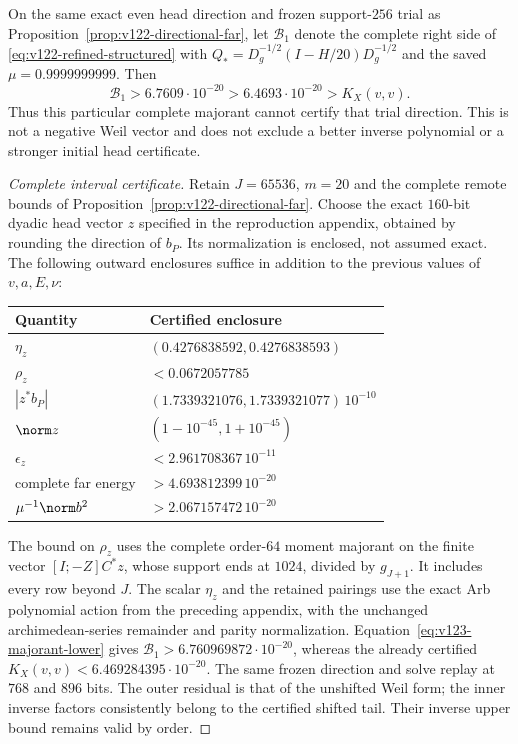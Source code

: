 \begin{proposition}
\label{prop:v123-first-majorant-fails}
On the same exact even head direction and frozen support-$256$
trial as Proposition~\ref{prop:v122-directional-far}, let
$\mathcal B_1$ denote the complete right side of
\eqref{eq:v122-refined-structured} with
$Q_*=D_g^{-1/2}(I-H/20)D_g^{-1/2}$ and the saved
$\mu=0.9999999999$. Then
\begin{equation}\label{eq:v123-first-majorant-fails}
 \mathcal B_1>6.7609\cdot10^{-20}
 >6.4693\cdot10^{-20}>K_X(v,v).
\end{equation}
Thus this particular complete majorant cannot certify that trial
direction. This is not a negative Weil vector and does not exclude
a better inverse polynomial or a stronger initial head certificate.
\end{proposition}
\begin{proof}[Complete interval certificate]
Retain $J=65536$, $m=20$ and the complete remote bounds of
Proposition~\ref{prop:v122-directional-far}. Choose the exact
$160$-bit dyadic head vector $z$ specified in the reproduction
appendix, obtained by rounding the direction of $b_P$. Its
normalization is enclosed, not assumed exact. The following
outward enclosures suffice in addition to the previous values of
$v,a,E,\nu$:
\begin{center}
\begin{tabular}{@{}ll@{}}
\toprule Quantity & Certified enclosure\\\midrule
$\eta_z$ & $(0.4276838592,0.4276838593)$\\
$\rho_z$ & $<0.0672057785$\\
$|z^*b_P|$ & $(1.7339321076,1.7339321077)\,10^{-10}$\\
$\norm z$ & $(1-10^{-45},1+10^{-45})$\\
$\epsilon_z$ & $<2.961708367\,10^{-11}$\\
complete far energy & $>4.693812399\,10^{-20}$\\
$\mu^{-1}\norm b^2$ & $>2.067157472\,10^{-20}$\\\bottomrule
\end{tabular}
\end{center}
The bound on $\rho_z$ uses the complete order-$64$ moment
majorant on the finite vector $[I;-Z]C^*z$, whose support ends
at $1024$, divided by $g_{J+1}$. It includes every row beyond
$J$. The scalar $\eta_z$ and the retained pairings use the exact
Arb polynomial action from the preceding appendix, with the
unchanged archimedean-series remainder and parity normalization.
Equation~\eqref{eq:v123-majorant-lower} gives
$\mathcal B_1>6.760969872\cdot10^{-20}$, whereas the already
certified $K_X(v,v)<6.469284395\cdot10^{-20}$.
The same frozen direction and solve replay at $768$ and $896$
bits. The outer residual is that of the unshifted Weil form;
the inner inverse factors consistently belong to the certified
shifted tail. Their inverse upper bound remains valid by order.
\end{proof}

